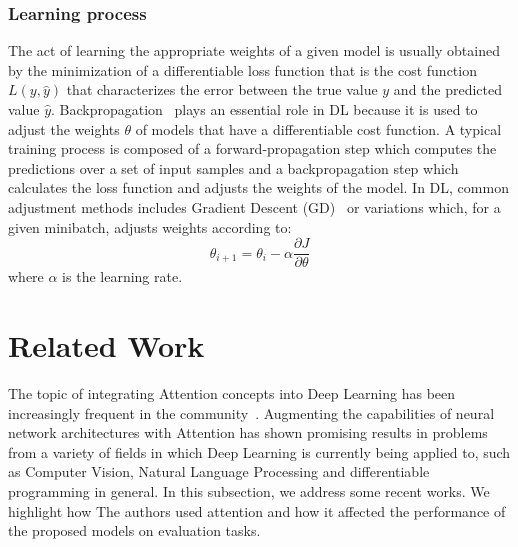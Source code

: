 \documentclass[12pt]{article}
\begin{document}
\subsubsection{Learning process}
The act of learning the appropriate weights of a given model
is usually obtained by the minimization of a differentiable loss function
that is the cost function $L(y, \hat{y})$ that characterizes the error
between the true value $y$ and the predicted value $\hat{y}$.
Backpropagation~\cite{ref:backprop} plays an essential role in DL because it is used to adjust the weights $\theta$ of models that have a
differentiable cost function.
A typical training process is composed of a forward-propagation
step which computes the predictions over a set of input samples
and a backpropagation step which calculates the loss function
and adjusts the weights of the model.
In DL, common adjustment methods includes Gradient Descent (GD)~\cite{ref:gd} or variations
which, for a given minibatch, adjusts weights according to:
$$\theta_{i+1} = \theta_i - \alpha\frac{\partial{J}}{\partial{\theta}}$$
where $\alpha$ is the learning rate.

\vspace{2cm}
\section{Related Work} \label{sess:related-work}
The topic of integrating Attention concepts into Deep Learning has been increasingly frequent
in the community~\cite{ref:att-survey}.
Augmenting the capabilities of neural network architectures with Attention has shown promising results
in problems from a variety of fields in which Deep Learning is currently being applied to, such as
Computer Vision, Natural Language Processing and differentiable programming in general.
In this subsection, we address some recent works.
We highlight how The authors used attention and how it affected the performance of the proposed models
on evaluation tasks.
\end{document}
